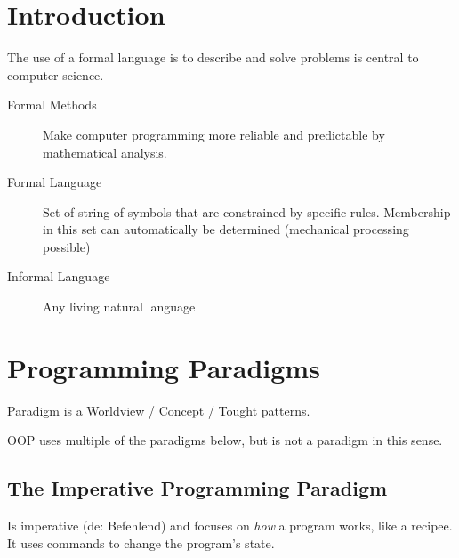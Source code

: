 


\newcommand{\SUBJECT}{Zusammenfassung}
\newcommand{\TITLE}{Programmieren und Formale Methoden}




\section{Introduction}
The use of a formal language is to describe and solve problems is central to computer science.

\begin{description}
	\item[Formal Methods] Make computer programming more reliable and predictable by mathematical analysis.
	\item[Formal Language] Set of string of symbols that are constrained by specific rules. Membership in this set can automatically be determined (mechanical processing possible)
	\item[Informal Language] Any living natural language
\end{description}

\section{Programming Paradigms}

Paradigm is a Worldview / Concept / Tought patterns.

OOP uses multiple of the paradigms below, but is not a paradigm in this sense.

\subsection{The Imperative Programming Paradigm}

Is imperative (de: Befehlend) and focuses on \emph{how} a program works, like a recipee. It uses commands to change the program's state.


